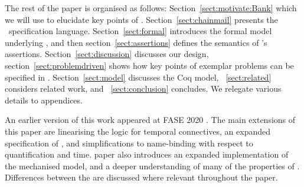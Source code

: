  
  
The rest of the paper is organised as follows:
Section~\ref{sect:motivate:Bank} 
 which we will use 
to elucidate key points of \Chainmail.
Section~\ref{sect:chainmail} presents the \Chainmail\ specification
language.  Section~\ref{sect:formal} introduces the formal model
underlying \Chainmail, and then section~\ref{sect:assertions} defines
the 
semantics of \Chainmail's assertions.
Section~\ref{sect:discussion}
discusses our design, section~\ref{sect:problemdriven} shows how key points of 
exemplar problems can be specified in \Chainmail. 
 Section~\ref{sect:model} discusses the Coq model, ~\ref{sect:related} considers related
work, and ~\ref{sect:conclusion} concludes.
We relegate various details to appendices. 

An earlier version of this work appeared at FASE 2020 \cite{FASE}. The main extensions of this paper are linearising the logic for temporal connectives, an expanded specification of \LangOO, and simplifications to name-binding with respect to quantification and time.  paper also introduces an expanded implementation of the mechanised model, and a deeper understanding of many of the properties of \Chainmail. Differences between the  are discussed where relevant throughout the paper.
